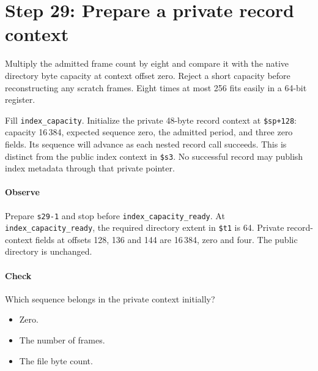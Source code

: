 \section{Step 29: Prepare a private record context}
Multiply the admitted frame count by eight and compare it with the native
directory byte capacity at context offset zero. Reject a short capacity before
reconstructing any scratch frames. Eight times at most 256 fits easily in a
64-bit register.

Fill \texttt{index\_capacity}. Initialize the private 48-byte record context
at \texttt{\$sp+128}: capacity 16\,384, expected sequence zero, the admitted
period, and three zero fields. Its sequence will advance as each nested record
call succeeds. This is distinct from the public index context in
\texttt{\$s3}. No successful record may publish index metadata through that
private pointer.

\paragraph{Observe} Prepare \texttt{s29-1} and stop before
\texttt{index\_capacity\_ready}. At \texttt{index\_capacity\_ready}, the required directory
extent in \texttt{\$t1} is 64. Private record-context fields at offsets 128,
136 and 144 are 16\,384, zero and four. The public directory is unchanged.

\paragraph{Check} Which sequence belongs in the private context initially?
\begin{itemize}
  \item[A.] Zero.
  \item[B.] The number of frames.
  \item[C.] The file byte count.
\end{itemize}
